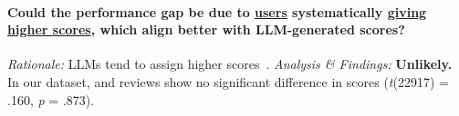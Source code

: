 \paragraph{Could the performance gap be due to \cnChinese \ul{users} systematically \ul{giving higher scores}, which align better with LLM-generated scores?}
\textit{Rationale:} LLMs tend to assign higher scores~\cite{stureborg2024large,kobayashi-etal-2024-large,golchin-etal-2025-grading}.
\textit{Analysis \& Findings:}
\textbf{Unlikely.}
In our dataset, \twChinese and \cnChinese reviews show no significant difference in scores (\textit{t}(22917) = .160, \textit{p} = .873).


